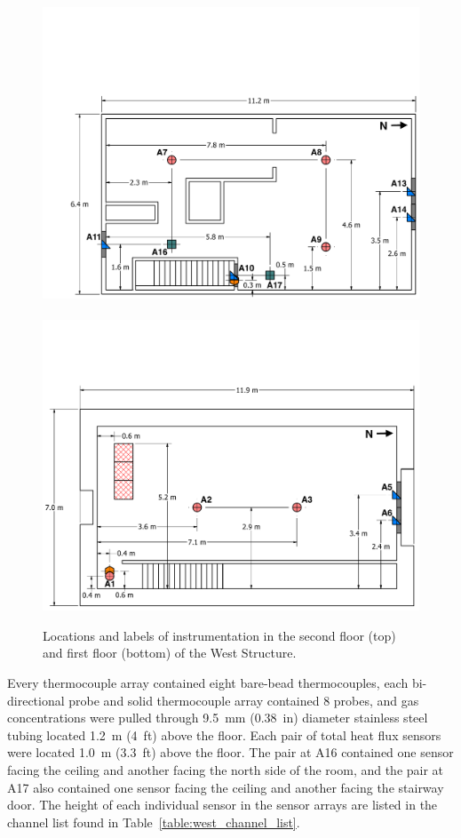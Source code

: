 \documentclass[12pt,oneside]{book}
\begin{document}
\begin{figure}[!ht]
	\includegraphics[width=0.94\columnwidth]{../Figures/Floor_Plans/West_Structure_2nd_Floor_Dimensioned_Instrumentation}
	\\~\\
	\includegraphics[width=\columnwidth]{../Figures/Floor_Plans/West_Structure_1st_Floor_Dimensioned_Instrumentation}
	\caption[Locations and labels of instrumentation in the West Structure.]{Locations and labels of instrumentation in the second floor (top) and first floor (bottom) of the West Structure.}
	\label{fig:west_instrumentation}
\end{figure}

Every thermocouple array contained eight bare-bead thermocouples, each bi-directional probe and solid thermocouple array contained 8 probes, and gas concentrations were pulled through 9.5~mm (0.38~in) diameter stainless steel tubing located 1.2~m (4~ft) above the floor. Each pair of total heat flux sensors were located 1.0~m (3.3~ft) above the floor. The pair at A16 contained one sensor facing the ceiling and another facing the north side of the room, and the pair at A17 also contained one sensor facing the ceiling and another facing the stairway door. The height of each individual sensor in the sensor arrays are listed in the channel list found in Table~\ref{table:west_channel_list}.
\end{document}
